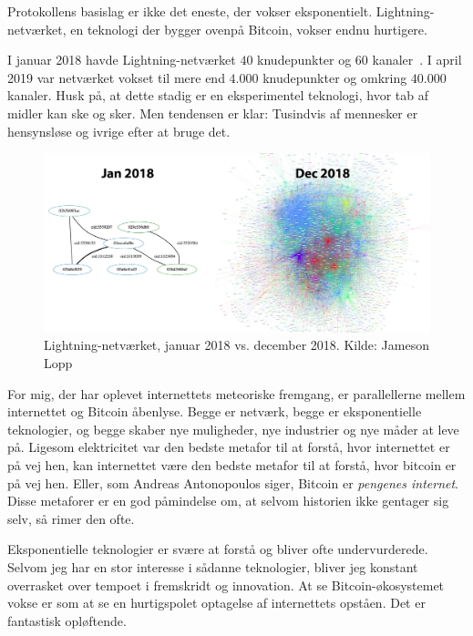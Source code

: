 \documentclass[paper=6in:9in,pagesize=pdftex,headinclude=on,footinclude=on,12pt]{scrbook}
\begin{document}
Protokollens basislag er ikke det eneste, der vokser eksponentielt. Lightning-netværket, en teknologi der bygger ovenpå Bitcoin, vokser endnu hurtigere.

I januar 2018 havde Lightning-netværket $40$ knudepunkter og $60$ kanaler~\cite{web:lightning-nodes}. I april 2019 var netværket vokset til mere end $4.000$ knudepunkter og omkring $40.000$ kanaler. Husk på, at dette stadig er en eksperimentel teknologi, hvor tab af midler kan ske og sker. Men tendensen er klar: Tusindvis af mennesker er hensynsløse og ivrige efter at bruge det.\begin{figure}
  \includegraphics{assets/images/lnd-growth-lopp-white.png}
  \caption{Lightning-netværket, januar 2018 vs. december 2018. Kilde: Jameson Lopp}
  \label{fig:lnd-growth-lopp-white.png}
\end{figure}

For mig, der har oplevet internettets meteoriske fremgang, er parallellerne mellem internettet og Bitcoin åbenlyse. Begge er netværk, begge er eksponentielle teknologier, og begge skaber nye muligheder, nye industrier og nye måder at leve på. Ligesom elektricitet var den bedste metafor til at forstå, hvor internettet er på vej hen, kan internettet være den bedste metafor til at forstå, hvor bitcoin er på vej hen. Eller, som Andreas Antonopoulos siger, Bitcoin er \textit{pengenes internet}. Disse metaforer er en god påmindelse om, at selvom historien ikke gentager sig selv, så rimer den ofte.

Eksponentielle teknologier er svære at forstå og bliver ofte undervurderede. Selvom jeg har en stor interesse i sådanne teknologier, bliver jeg konstant overrasket over tempoet i fremskridt og innovation. At se Bitcoin-økosystemet vokse er som at se en hurtigspolet optagelse af internettets opståen. Det er fantastisk opløftende.
\end{document}
